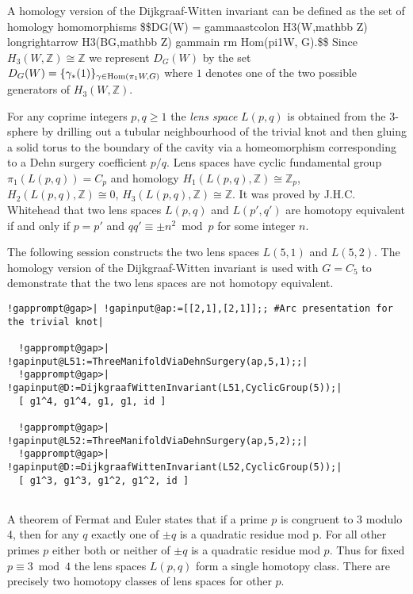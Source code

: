 \documentclass[a4paper,11pt]{report}
\begin{document}
{{A homology version of the Dijkgraaf-Witten invariant can be defined as the set
of homology homomorphisms \$\$D{\textunderscore}G(W)
=\texttt{}\texttt{}
\texttt{}gamma{\textunderscore}\texttt{}ast\texttt{}colon
H{\textunderscore}3(W,\texttt{}mathbb Z)
\texttt{}longrightarrow
H{\textunderscore}3(BG,\texttt{}mathbb Z)
\texttt{}\texttt{}{\textunderscore}\texttt{}\texttt{}gamma\texttt{}in
\texttt{}\texttt{}rm
Hom\texttt{}(\texttt{}pi{\textunderscore}1W,
G)\texttt{}.\$\$ Since $H_3(W,\mathbb Z)\cong \mathbb Z$ we represent $D_G(W)$ by the set $D_G(W)=\{ \gamma_\ast(1) \}_{\gamma\in {\rm Hom}(\pi_1W, G)}$ where $1$ denotes one of the two possible generators of $H_3(W,\mathbb Z)$. 

 For any coprime integers $p,q\ge 1$ the \emph{lens space} $L(p,q)$ is obtained from the 3-sphere by drilling out a tubular neighbourhood of the
trivial knot and then gluing a solid torus to the boundary of the cavity via a
homeomorphism corresponding to a Dehn surgery coefficient $p/q$. Lens spaces have cyclic fundamental group $\pi_1(L(p,q))=C_p$ and homology $H_1(L(p,q),\mathbb Z)\cong \mathbb Z_p$, $H_2(L(p,q),\mathbb Z)\cong 0$, $H_3(L(p,q),\mathbb Z)\cong \mathbb Z$. It was proved by J.H.C. Whitehead that two lens spaces $L(p,q)$ and $L(p',q')$ are homotopy equivalent if and only if $p=p'$ and $qq'\equiv \pm n^2 \bmod p$ for some integer $n$. 

 The following session constructs the two lens spaces $L(5,1)$ and $L(5,2)$. The homology version of the Dijkgraaf-Witten invariant is used with $G=C_5$ to demonstrate that the two lens spaces are not homotopy equivalent. 
\begin{Verbatim}[commandchars=!@|,fontsize=\small,frame=single,label=Example]
  !gapprompt@gap>| !gapinput@ap:=[[2,1],[2,1]];; #Arc presentation for the trivial knot|
  
  !gapprompt@gap>| !gapinput@L51:=ThreeManifoldViaDehnSurgery(ap,5,1);;|
  !gapprompt@gap>| !gapinput@D:=DijkgraafWittenInvariant(L51,CyclicGroup(5));|
  [ g1^4, g1^4, g1, g1, id ]
  
  !gapprompt@gap>| !gapinput@L52:=ThreeManifoldViaDehnSurgery(ap,5,2);;|
  !gapprompt@gap>| !gapinput@D:=DijkgraafWittenInvariant(L52,CyclicGroup(5));|
  [ g1^3, g1^3, g1^2, g1^2, id ]
  
\end{Verbatim}
 A theorem of Fermat and Euler states that if a prime $p$ is congruent to 3 modulo 4, then for any $q$ exactly one of $\pm q$ is a quadratic residue mod p. For all other primes $p$ either both or neither of $\pm q$ is a quadratic residue mod $p$. Thus for fixed $p \equiv 3 \bmod 4$ the lens spaces $L(p,q)$ form a single homotopy class. There are precisely two homotopy classes of lens
spaces for other $p$. 

}}
\end{document}
